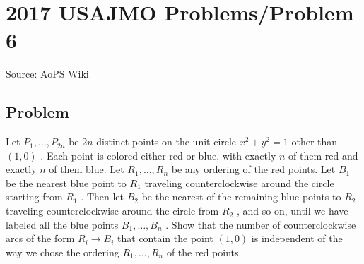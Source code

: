 \documentclass[12pt]{article}
\begin{document}
\section*{{2017 USAJMO Problems/Problem 6}}
Source: AoPS Wiki

\subsection*{Problem}
Let $P_1, \ldots, P_{2n}$ be $2n$ distinct points on the unit circle $x^2 + y^2 = 1$ other than $(1,0)$ . Each point is colored either red or blue, with exactly $n$ of them red and exactly $n$ of them blue. Let $R_1, \ldots, R_n$ be any ordering of the red points. Let $B_1$ be the nearest blue point to $R_1$ traveling counterclockwise around the circle starting from $R_1$ . Then let $B_2$ be the nearest of the remaining blue points to $R_2$ traveling counterclockwise around the circle from $R_2$ , and so on, until we have labeled all the blue points $B_1, \ldots, B_n$ . Show that the number of counterclockwise arcs of the form $R_i \rightarrow B_i$ that contain the point $(1,0)$ is independent of the way we chose the ordering $R_1, \ldots, R_n$ of the red points.
\end{document}
